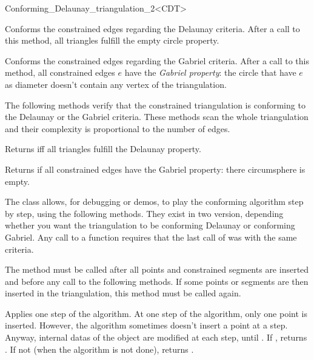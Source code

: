 \begin{ccRefClass}{Conforming_Delaunay_triangulation_2<CDT>}

{ Conforms the constrained edges regarding the Delaunay criteria.
  After a call to this method, all triangles fulfill the empty circle
  property. }

{ Conforms the constrained edges regarding the Gabriel criteria. After
  a call to this method, all constrained edges $e$ have the
  \emph{Gabriel property}: the circle that have $e$ as diameter
  doesn't contain any vertex of the triangulation. }

The following methods verify that the constrained triangulation is
conforming to the Delaunay or the Gabriel criteria. These methods scan 
the whole triangulation and their complexity is proportional to the
number of edges.

{ Returns  iff all triangles fulfill the Delaunay property.}

{ Returns  if all constrained edges have the Gabriel property:
  there circumsphere is empty. }

\begin{ccAdvanced}


The \ccRefName{} class allows, for debugging or demos, to play the
conforming algorithm step by step, using the following methods. They exist
in two version, depending whether you want the triangulation to be
conforming Delaunay or conforming Gabriel. Any call to a
 function requires that the last call of
 was with the same criteria.

         { The method must be called after all points and constrained
           segments are inserted and before any call to the following
           methods. If some points or segments are then inserted 
           in the triangulation, this method must be called again. }

         { Applies one step of the algorithm. At one step of the algorithm,
           only one point is inserted. However, the algorithm
           sometimes doesn't insert a point at a step. Anyway,
           internal datas of the \ccRefName{} object are modified at
           each step, until . If
           , returns . If not (when
           the algorithm is not done), returns .}


\end{ccAdvanced}
\end{ccRefClass}
